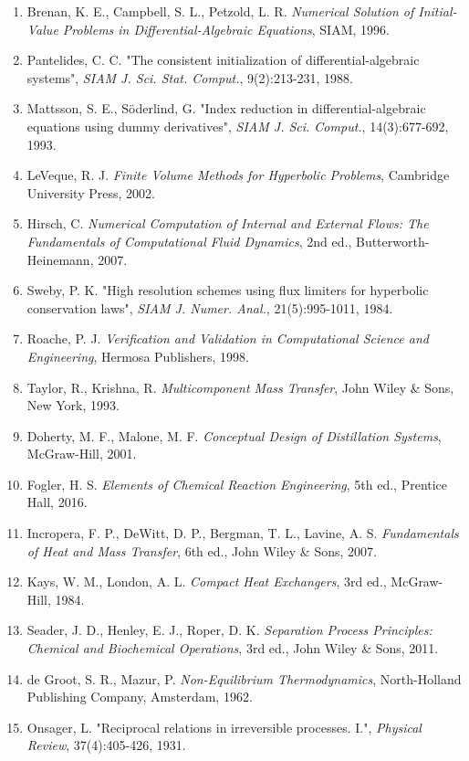 \documentclass[11pt,a4paper]{article}
\begin{document}
\begin{enumerate}[leftmargin=*]
    \item Brenan, K. E., Campbell, S. L., Petzold, L. R. \textit{Numerical Solution of Initial-Value Problems in Differential-Algebraic Equations}, SIAM, 1996.
    \item Pantelides, C. C. "The consistent initialization of differential-algebraic systems", \textit{SIAM J. Sci. Stat. Comput.}, 9(2):213-231, 1988.
    \item Mattsson, S. E., S\"oderlind, G. "Index reduction in differential-algebraic equations using dummy derivatives", \textit{SIAM J. Sci. Comput.}, 14(3):677-692, 1993.
    \item LeVeque, R. J. \textit{Finite Volume Methods for Hyperbolic Problems}, Cambridge University Press, 2002.
    \item Hirsch, C. \textit{Numerical Computation of Internal and External Flows: The Fundamentals of Computational Fluid Dynamics}, 2nd ed., Butterworth-Heinemann, 2007.
    \item Sweby, P. K. "High resolution schemes using flux limiters for hyperbolic conservation laws", \textit{SIAM J. Numer. Anal.}, 21(5):995-1011, 1984.
    \item Roache, P. J. \textit{Verification and Validation in Computational Science and Engineering}, Hermosa Publishers, 1998.
    \item Taylor, R., Krishna, R. \textit{Multicomponent Mass Transfer}, John Wiley \& Sons, New York, 1993.
    \item Doherty, M. F., Malone, M. F. \textit{Conceptual Design of Distillation Systems}, McGraw-Hill, 2001.
    \item Fogler, H. S. \textit{Elements of Chemical Reaction Engineering}, 5th ed., Prentice Hall, 2016.
    \item Incropera, F. P., DeWitt, D. P., Bergman, T. L., Lavine, A. S. \textit{Fundamentals of Heat and Mass Transfer}, 6th ed., John Wiley \& Sons, 2007.
    \item Kays, W. M., London, A. L. \textit{Compact Heat Exchangers}, 3rd ed., McGraw-Hill, 1984.
    \item Seader, J. D., Henley, E. J., Roper, D. K. \textit{Separation Process Principles: Chemical and Biochemical Operations}, 3rd ed., John Wiley \& Sons, 2011.
    \item de Groot, S. R., Mazur, P. \textit{Non-Equilibrium Thermodynamics}, North-Holland Publishing Company, Amsterdam, 1962.
    \item Onsager, L. "Reciprocal relations in irreversible processes. I.", \textit{Physical Review}, 37(4):405-426, 1931.

\end{enumerate}
\end{document}
